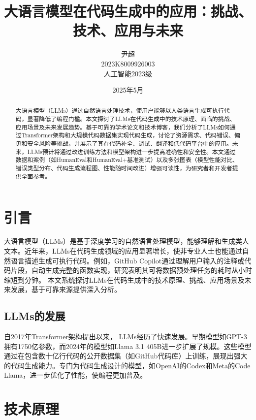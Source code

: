 \documentclass[11pt]{article}
\begin{document}
\title{大语言模型在代码生成中的应用：挑战、技术、应用与未来}
\author{
    尹超 \\
    2023K8009926003 \\
    人工智能2023级 \\
}
\date{2025年5月}
\maketitle

\begin{abstract}
大语言模型（LLMs）通过自然语言处理技术，使用户能够以人类语言生成可执行代码，显著降低了编程门槛。本文探讨了LLMs在代码生成中的技术原理、面临的挑战、应用场景及未来发展趋势。基于可靠的学术论文和技术博客，我们分析了LLMs如何通过Transformer架构和大规模代码数据集实现代码生成，讨论了资源需求、代码错误、偏见和安全风险等挑战，并展示了其在代码补全、调试、翻译和低代码平台中的应用。未来，LLMs预计将通过改进训练方法和模型架构进一步提高准确性和安全性。本文通过数据和案例（如HumanEval和HumanEval+基准测试）以及多张图表（模型性能对比、错误类型分布、代码生成流程图、性能随时间改进）增强可读性，为研究者和开发者提供全面参考。
\end{abstract}

\section{引言}
大语言模型（LLMs）是基于深度学习的自然语言处理模型，能够理解和生成类人文本。近年来，LLMs在代码生成领域的应用显著增长，使非专业人士也能通过自然语言描述生成可执行代码。例如，GitHub Copilot通过理解用户输入的注释或代码片段，自动生成完整的函数实现，研究表明其可将数据预处理任务的耗时从小时缩短到分钟。%
本文系统探讨LLMs在代码生成中的技术原理、挑战、应用场景及未来发展，基于可靠来源提供深入分析。

\subsection{LLMs的发展}
自2017年Transformer架构提出以来，%
LLMs经历了快速发展。早期模型如GPT-3拥有1750亿参数，而2024年的模型如Llama 3.1 405B进一步扩展了规模。这些模型通过在包含数十亿行代码的公开数据集（如GitHub代码库）上训练，展现出强大的代码生成能力。专门为代码生成设计的模型，如OpenAI的Codex和Meta的Code Llama，进一步优化了性能，使编程更加普及。

\section{技术原理}
\end{document}
